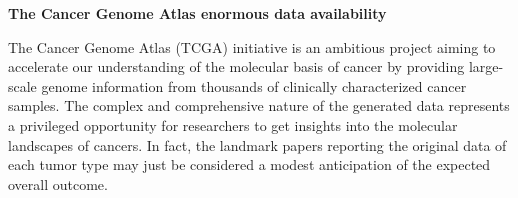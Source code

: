 \documentclass[a0,portrait]{a0poster}
\newenvironment{Section}[1]{
\par 
\flushleft
\colorbox{boxcol}{ 				%
\sffamily\large\color{black} #1%
\hspace{0.5cm}}
\par\nobreak 
\nointerlineskip 						%
\setlength\parskip{-1pt}					%
\begin{lrbox}\envbox						%
\begin{minipage}{0.95\columnwidth}		%
}
{\par
\end{minipage}\end{lrbox}				%
\fcolorbox{boxcol}{fillcol}{\usebox\envbox}	%
\vspace{1cm}							%
}
\begin{document}
\vspace{1cm} %



\begin{multicols}{2} %








\vspace{-14cm}

\begin{Section}{\textbf{The Cancer Genome Atlas enormous data availability}}

The Cancer Genome Atlas (TCGA) initiative is an ambitious project aiming to accelerate our understanding of the molecular basis of cancer by providing large-scale genome information from thousands of clinically characterized cancer samples. The complex and comprehensive  nature of the generated data represents a privileged opportunity for researchers to get insights into the molecular landscapes of cancers. In fact, the landmark papers reporting the original data of each tumor type may just be considered a modest anticipation of the expected overall outcome.\\


\end{Section}
\end{multicols}
\end{document}
